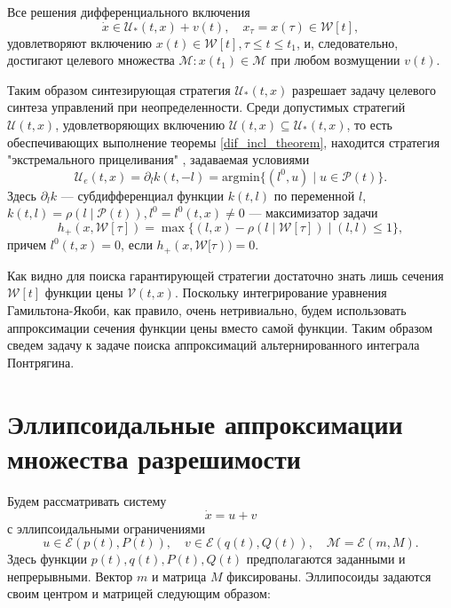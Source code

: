 \begin{theorem}\label{dif_incl_theorem}
    Все решения дифференциального включения
    \begin{equation*}
        \dot{x} \in \mathcal{U}_*(t,x) + v(t), \quad x_{\tau} = x(\tau) \in \mathcal{W}[t],
    \end{equation*}
    удовлетворяют включению \( x(t) \in \mathcal{W}[t] , \tau \le t \le t_1 \), и, следовательно,
     достигают целевого множества \( \mathcal{M} : x(t_1) \in \mathcal{M} \) при любом возмущении
     \( v(t) \). 
\end{theorem}

Таким образом синтезирующая стратегия \( \mathcal{U}_*(t,x) \) разрешает задачу целевого синтеза 
 управлений при неопределенности. Среди допустимых стратегий \( \mathcal{U}(t,x) \), удовлетворяющих
 включению \( \mathcal{U}(t,x) \subseteq \mathcal{U}_*(t,x) \), то есть обеспечивающих выполнение
 теоремы \eqref{dif_incl_theorem}, находится стратегия "экстремального прицеливания" , задаваемая
 условиями
\begin{equation}
    \mathcal{U}_e(t,x) = \partial_l k(t, -l) = \mathrm{arg min} \{(l^0, u) \mid u \in \mathcal{P}(t) \}.
\end{equation}
Здесь \( \partial_l k \) --- субдифференциал функции \( k(t, l) \) по переменной \( l \), \( k(t,l)
 = \rho(l \mid \mathcal{P}(t)), l^0 = l^0(t, x) \ne 0 \) --- максимизатор задачи 
\begin{equation}\label{extr_problem}
    h_+(x, \mathcal{W}[\tau]) = \max \{(l,x) - \rho(l \mid \mathcal{W}[\tau]) \mid (l,l) \le 1 \},
\end{equation}
причем \( l^0(t,x) = 0 \), если \( h_+(x, \mathcal{W}[\tau)) = 0 \).

Как видно для поиска гарантирующей стратегии достаточно знать лишь сечения \( \mathcal{W}[t] \) функции
 цены \( \mathcal{V}(t,x) \). Поскольку интегрирование уравнения Гамильтона-Якоби, как правило, очень 
 нетривиально, будем использовать аппроксимации сечения функции цены вместо самой функции. Таким 
 образом сведем задачу к задаче поиска аппроксимаций альтернированного интеграла Понтрягина.

\section{Эллипсоидальные аппроксимации множества разрешимости}
Будем рассматривать систему
\begin{equation*}
    \dot{x} = u + v
\end{equation*}
с эллипсоидальными ограничениями
\begin{equation*}
    u \in \mathcal{E}(p(t), P(t)), \quad v \in \mathcal{E}(q(t), Q(t)), \quad \mathcal{M} = 
     \mathcal{E}(m, M).
\end{equation*}
Здесь функции \( p(t), q(t), P(t), Q(t) \) предполагаются заданными и непрерывными. Вектор \( m \) и
 матрица \( M \) фиксированы. Эллипосоиды задаются своим центром и матрицей следующим образом:
 
